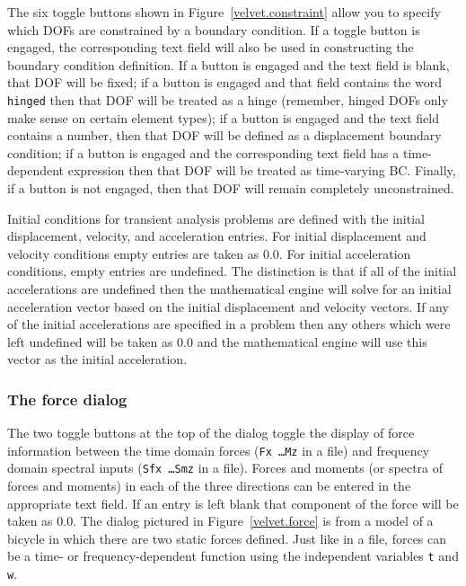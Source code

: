 The six toggle buttons shown in Figure~\ref{velvet.constraint}
allow you to specify which DOFs are constrained by a boundary condition.  
If a toggle button is engaged, the corresponding text field will also
be used in constructing the boundary condition definition.  If a button is
engaged and the text field is blank, that DOF will be fixed; if a button
is engaged and that field contains the word {\tt hinged} then that
DOF will be treated as a hinge (remember, hinged DOFs only make sense
on certain element types); if a button is engaged and the text field
contains a number, then that DOF will be defined as a displacement boundary
condition; if a button is engaged and the corresponding text field has a
time-dependent expression then that DOF will be treated as time-varying BC.
Finally, if a button is not engaged, then that DOF will remain
completely unconstrained.

Initial conditions for transient analysis problems are defined
with the initial displacement, velocity, and acceleration entries.  For 
initial displacement and velocity conditions
empty entries are taken as 0.0.  For initial acceleration conditions, empty
entries are undefined.  The distinction is that if all of the initial
accelerations are undefined then the mathematical engine will solve for
an initial acceleration vector based on the initial displacement and velocity
vectors.  If any of the initial accelerations are specified in a problem then
any others which were left undefined will be taken as 0.0 and the mathematical
engine will use this vector as the initial acceleration.

\subsubsection{The force dialog}

The two toggle buttons at the top of the dialog toggle the display of force
information between the time domain forces ({\tt Fx \ldots Mz} in a 
\felt{} file) and frequency domain spectral inputs ({\tt Sfx \ldots Smz} in
a \felt{} file).
Forces and moments (or spectra of forces and moments) in each of the three 
directions can be entered in
the appropriate text field.  If an entry is left blank that component
of the force will be taken as 0.0.  The dialog pictured in 
Figure~\ref{velvet.force} is from a model of a bicycle in which there are
two static forces defined.  Just like in a \felt{} file, forces
can be a time- or frequency-dependent function using the independent
variables {\tt t} and {\tt w}.

